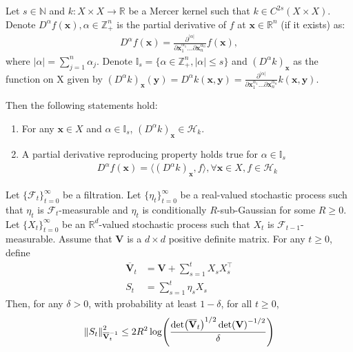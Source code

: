 \begin{auxlemma}
\label{lemma:pinn-bo_rkhs_derivative}
    Let $s \in \mathbb{N}$ and $k \colon X \times X \rightarrow \mathbb{R}$ be a Mercer kernel such that $k \in C^{2s} (X \times X)$. Denote $D^\alpha f(\mathbf{x}), \alpha \in \mathbb{Z}^n_+$ is the partial derivative of $f$ at $\mathbf{x} \in \mathbb{R}^n$ (if it exists) as:
\begin{align*}
    D^\alpha f(\mathbf{x}) =  \frac{\partial ^ {\lvert \alpha \rvert}}{\partial{\mathbf{x}_1^{\alpha_1}} \dots \partial{\mathbf{x}_n^{\alpha_n}}} f(\mathbf{x}),
\end{align*}
where $\lvert \alpha \rvert = \sum_{j=1}^n \alpha_j$. Denote $\mathbb{I}_s = \{\alpha \in \mathbb{Z}_+^n, \lvert \alpha \rvert \le s\}$ and  $(D^\alpha k)_\mathbf{x}$ as the function on X given by $(D^\alpha k)_\mathbf{x} (\mathbf{y}) = D^\alpha k(\mathbf{x}, \mathbf{y}) =  \frac{\partial^ {\lvert \alpha \rvert}}{\partial{\mathbf{x}_1^{\alpha_1}} \dots \partial{\mathbf{x}_n^{\alpha_n}}} k(\mathbf{x}, \mathbf{y})$.

Then the following statements hold: 

\begin{enumerate}
    \item For any $\mathbf{x} \in X$ and  $\alpha \in \mathbb{I}_s$, $(D^\alpha k)_\mathbf{x} \in \mathcal{H}_k$.
    \item A partial derivative reproducing property holds true for $\alpha \in \mathbb{I}_s$
    \begin{align*}
        D^\alpha f(\mathbf{x}) = \langle (D^\alpha k)_\mathbf{x}, f \rangle,  \forall \mathbf{x} \in X, f \in \mathcal{H}_k
    \end{align*}
\end{enumerate}
\end{auxlemma}

\begin{auxlemma}
\label{lemma:pinn-bo_self-normalized_bound}
Let $\{\mathcal{F}_t\}_{t=0}^\infty$ be a filtration. Let $\{\eta_t\}_{t=0}^\infty$ be a real-valued stochastic process such that $\eta_t$ is $\mathcal{F}_t$-measurable and $\eta_t$ is conditionally
$R$-sub-Gaussian for some $R \ge 0$. Let $\{X_t\}_{t=0}^\infty$ be an $\mathbb{R}^d$-valued stochastic process such that $X_t$ is $\mathcal{F}_{t-1}$-measurable. Assume that $\mathbf{V}$
is a $d \times d$ positive definite matrix. For any $t \ge 0$, define
\begin{align*}
    \overline{\mathbf{V}}_t &= \mathbf{V} + \sum_{s=1}^t X_s X_s^\top  \\
    S_t &= \sum_{s=1}^t \eta_s X_s
\end{align*}
Then, for any $\delta > 0$, with probability at least $1 - \delta$, for all $t \ge 0$,
\[
\norm{S_t}^2_{\overline{\mathbf{V}}_t^{-1}} \le 2R^2\log(\frac{\det(\overline{\mathbf{V}}_t)^{1/2}\det(\mathbf{V})^{-1/2}}{\delta})
\] 
\end{auxlemma}

